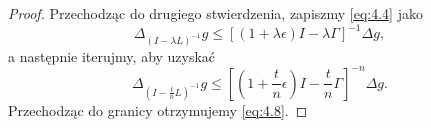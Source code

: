\documentclass{article}
\begin{document}
\begin{proof}
	Przechodząc do drugiego stwierdzenia, zapiszmy \eqref{eq:4.4} jako
	\[
		\Delta_{(I - \lambda L)^{-1}} g 
		\leq \left[ (1 + \lambda \epsilon)I - \lambda \Gamma \right]^{-1} \Delta g,
	\]
	a następnie iterujmy, aby uzyskać
	\[
		\Delta_{(I - \frac{t}{n} L)^{-1}} g \leq 
		\left[ \left( 1 + \frac{t}{n} \epsilon \right) I - \frac{t}{n} \Gamma \right]^{-n} 
		\Delta g.
	\]
	Przechodząc do granicy otrzymujemy \eqref{eq:4.8}.
\end{proof}
\end{document}

